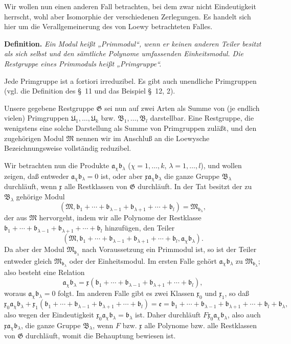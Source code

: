 \documentclass[11pt]{article}
\newcommand{\mM}{\mathfrak{M}}
\newcommand{\mG}{\mathfrak{G}}
\newcommand{\mB}{\mathfrak{B}}
\newcommand{\ma}{\mathfrak{a}}
\newcommand{\mb}{\mathfrak{b}}
\newcommand{\mx}{\mathfrak{x}}
\newcommand{\me}{\mathfrak{e}}
\newcommand{\mU}{\mathfrak{U}}
\begin{document}
Wir wollen nun einen anderen Fall betrachten, bei dem zwar nicht Eindeutigkeit herrscht, wohl aber Isomorphie der verschiedenen Zerlegungen. Es handelt sich hier um die Verallgemeinerung des von Loewy betrachteten Falles.

\textbf{Definition.} \emph{Ein Modul heißt „Primmodul“, wenn er keinen anderen Teiler besitzt als sich selbst und den sämtliche Polynome umfassenden Einheitsmodul. Die Restgruppe eines Primmoduls heißt „Primgruppe“.}

Jede Primgruppe ist a fortiori irreduzibel. Es gibt auch unendliche Primgruppen (vgl. die Definition des \S~11 und das Beispiel \S~12, 2).

Unsere gegebene Restgruppe $\mG$ sei nun auf zwei Arten als Summe von (je endlich vielen) Primgruppen $\mU_1,\ldots,\mU_k$ bzw. $\mB_1,\ldots,\mB_l$ darstellbar. Eine Restgruppe, die wenigstens eine solche Darstellung als Summe von Primgruppen zuläßt, und den zugehörigen Modul $\mM$ nennen wir im Anschluß an die Loewysche Bezeichnungsweise vollständig reduzibel.

Wir betrachten nun die Produkte $\ma_\chi\mb_\lambda$ ($\chi=1,\ldots,k$, $\lambda=1,\ldots,l$), und wollen zeigen, daß entweder $\ma_\chi\mb_\lambda=0$ ist, oder aber $\mx\ma_\chi\mb_\lambda$ die ganze Gruppe $\mB_\lambda$ durchläuft, wenn $\mx$ alle Restklassen von $\mG$ durchläuft. In der Tat besitzt der zu $\mB_\lambda$ gehörige Modul
\[
 (\mM,\mb_1+\cdots+\mb_{\lambda-1}+\mb_{\lambda+1}+\cdots+\mb_l)=\mM_{\mb_\lambda},
\]
der aus $\mM$ hervorgeht, indem wir alle Polynome der Restklasse $\mb_1+
\cdots+\mb_{\lambda-1}+\mb_{\lambda+1}+\cdots+\mb_l$ hinzufügen, den Teiler
\[
 (\mM,\mb_1+\cdots+\mb_{\lambda-1}+\mb_{\lambda+1}+\cdots+\mb_l,
 \ma_\chi\mb_\lambda).
\]
Da aber der Modul $\mM_{\mb_\lambda}$ nach Voraussetzung ein Primmodul ist, so ist der Teiler entweder gleich $\mM_{\mb_\lambda}$ oder der Einheitsmodul. Im ersten Falle gehört $\ma_\chi\mb_\lambda$ zu $\mM_{\mb_\lambda}$; also besteht eine Relation
\[
 \ma_\chi\mb_\lambda=\mx(\mb_1+
\cdots+\mb_{\lambda-1}+\mb_{\lambda+1}+\cdots+\mb_l),
\]
woraus $\ma_\chi\mb_\lambda=0$ folgt. Im anderen Falle gibt es zwei Klassen $\mx_0$ und $\mx_1$, so daß
\[
 \mx_0\ma_\chi\mb_\lambda
 +\mx_1(\mb_1+\cdots+\mb_{\lambda-1}+\mb_{\lambda+1}+\cdots+\mb_l)
 =\me=\mb_1+\cdots+\mb_{\lambda-1}+\mb_{\lambda+1}+\cdots+\mb_l+\mb_\lambda,
\]
also wegen der Eindeutigkeit $\mx_0\ma_\chi\mb_\lambda=\mb_\lambda$ ist. Daher durchläuft $F\mx_0\ma_\chi\mb_\lambda$, also auch $\mx\ma_\chi\mb_\lambda$, die ganze Gruppe $\mB_\lambda$, wenn $F$ bzw. $\mx$ alle Polynome bzw. alle Restklassen von $\mG$ durchläuft, womit die Behauptung bewiesen ist.
\end{document}
